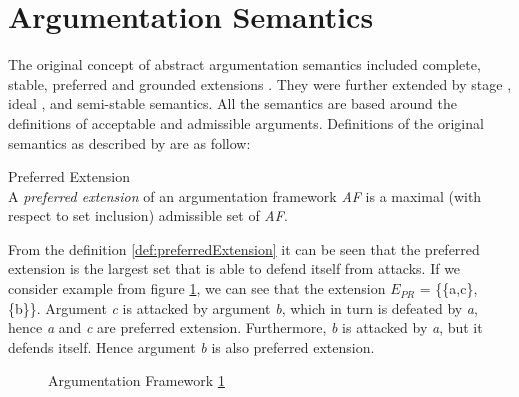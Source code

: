\section{Argumentation Semantics}
\label{sec:argumentationSemantics}


The original concept of abstract argumentation semantics included complete, stable, preferred and grounded extensions \citep{dung1995}. They were further extended by stage \citep{verheij1996two}, ideal \citep{dung2007computing}, and semi-stable \citep{caminada2006semi} semantics. All the semantics are based around the definitions of acceptable and admissible arguments. Definitions of the original semantics as described by \citet{dung1995} are as follow: 

\begin{definition}{Preferred Extension}
\label{def:preferredExtension}\\
A \textit{preferred extension} of an argumentation framework \textit{AF} is a maximal (with respect to set inclusion) admissible set of \textit{AF}.
\end{definition}


From the definition \ref{def:preferredExtension} it can be seen that the preferred extension is the largest set that is able to defend itself from attacks. If we consider example from figure \ref{fig:af1}, we can see that the extension \textit{$E_{PR}$} = \{\{a,c\}, \{b\}\}. Argument \textit{c} is attacked by argument \textit{b}, which in turn is defeated by \textit{a}, hence \textit{a} and \textit{c} are preferred extension. Furthermore, \textit{b} is attacked by \textit{a}, but it defends itself. Hence argument \textit{b} is also preferred extension.

\begin{figure}[h]
\centering
{}
\caption{Argumentation Framework \ref{fig:af1}}
\label{fig:af1}
\end{figure}

